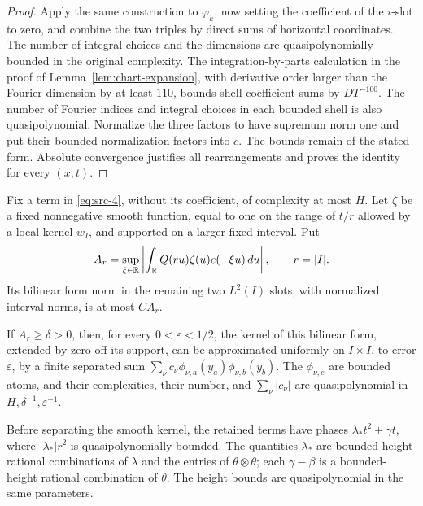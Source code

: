 \begin{proof}
Apply the same construction to \(\varphi_k\), now setting the
coefficient of the \(i\)-slot to zero, and combine the two triples
by direct sums of horizontal coordinates.
The number of integral choices and the dimensions are
quasipolynomially bounded in the original complexity.
The integration-by-parts calculation in the proof of
Lemma~\ref{lem:chart-expansion}, with derivative order larger than
the Fourier dimension by at least \(110\), bounds shell coefficient
sums by \(DT^{-100}\).
The number of Fourier indices and integral choices in each bounded
shell is also quasipolynomial.
Normalize the three factors to have supremum norm one and put their
bounded normalization factors into \(c\).  The bounds remain of the
stated form.  Absolute convergence justifies all rearrangements and
proves the identity for every \((x,t)\).
\end{proof}

\begin{lemma}\label{lem:single-scale-separation}
Fix a term in \eqref{eq:src-4}, without its coefficient, of complexity
at most \(H\).  Let \(\zeta\) be a fixed nonnegative smooth function,
equal to one on the range of \(t/r\) allowed by a local kernel \(w_I\),
and supported on a larger fixed interval.  Put
\[
 A_r=\sup_{\xi\in\mathbb R}
       \left|\int_\mathbb R Q(ru)\zeta(u)e(-\xi u)\,du\right|,
 \qquad r=|I|.
\]
Its bilinear form norm in the remaining two \(L^2(I)\) slots, with
normalized interval norms, is at most \(C A_r\).

If \(A_r\ge\delta>0\), then, for every \(0<\varepsilon<1/2\), the
kernel of this bilinear form, extended by zero off its support, can be
approximated uniformly on \(I\times I\), to error \(\varepsilon\),
by a finite separated sum
\(\sum_\nu c_\nu\phi_{\nu,a}(y_a)\phi_{\nu,b}(y_b)\).
The \(\phi_{\nu,e}\) are bounded atoms, and their complexities, their
number, and \(\sum_\nu|c_\nu|\) are quasipolynomial in
\(H,\delta^{-1},\varepsilon^{-1}\).

Before separating the smooth kernel, the retained terms have phases
\(\lambda_*t^2+\gamma t\), where
\(|\lambda_*|r^2\) is quasipolynomially bounded.
The quantities \(\lambda_*\) are bounded-height rational combinations
of \(\lambda\) and the entries of \(\theta\otimes\theta\); each
\(\gamma-\beta\) is a bounded-height rational combination of \(\theta\).
The height bounds are quasipolynomial in the same parameters.
\end{lemma}

